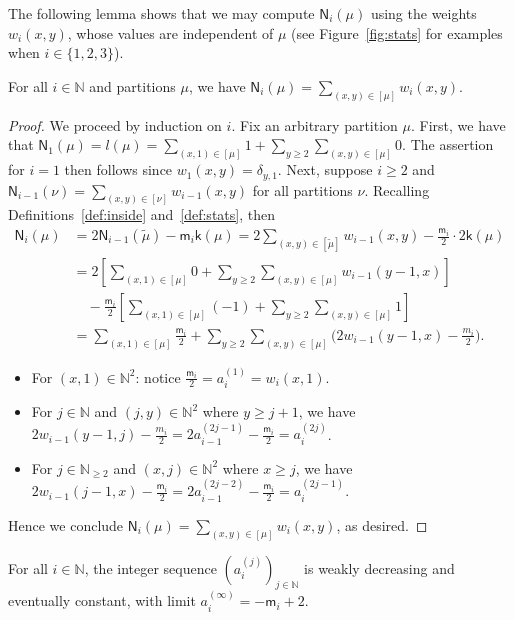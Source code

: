 \documentclass[ALCO, Unicode]{cedram}
\newcommand{\sk}{\mathsf{k}}
\newcommand{\sm}{\mathsf{m}}
\newcommand{\sn}{\mathsf{N}}
\newcommand{\N}{\mathbb{N}}
\begin{document}
The following lemma shows that we may compute $\sn_i(\mu)$ using the weights $w_i(x,y)$, whose values are independent of $\mu$ (see Figure~\ref{fig:stats} for examples when $i\in\{1,2,3\}$).
\begin{lemma}\label{lem:weights}
	For all $i\in\N$ and partitions $\mu$, we have $\sn_i(\mu) = \sum_{(x,y)\in[\mu]} w_i(x,y)$.
\end{lemma}

\begin{proof}
	We proceed by induction on $i$. Fix an arbitrary partition $\mu$.
	First, we have that $\sn_1(\mu)=l(\mu) = \sum_{(x,1)\in[\mu]}1 + \sum_{y\ge 2}\sum_{(x,y)\in[\mu]}0$. The assertion for $i=1$ then follows since $w_1(x,y)=\delta_{y,1}$.
	Next, suppose $i\ge 2$ and $\sn_{i-1}(\nu) = \sum_{(x,y)\in[\nu]} w_{i-1}(x,y)$ for all partitions $\nu$. Recalling Definitions~\ref{def:inside} and~\ref{def:stats}, then
	\begin{align*}
		\sn_i(\mu) &= 2\sn_{i-1}(\tilde{\mu}) - \sm_i\sk(\mu) = 2\sum_{(x,y)\in[\tilde{\mu}]} w_{i-1}(x,y) - \tfrac{\sm_i}{2}\cdot 2\sk(\mu)\\
		&=2\left[ \sum_{(x,1)\in[\mu]}0 + \sum_{y\ge 2}\sum_{(x,y)\in[\mu]}w_{i-1}(y-1,x)\right] \\&\quad- \tfrac{\sm_i}{2}\left[ \sum_{(x,1)\in[\mu]}(-1) + \sum_{y\ge 2}\sum_{(x,y)\in[\mu]}1 \right]\\
		&= \sum_{(x,1)\in[\mu]}\tfrac{\sm_i}{2} + \sum_{y\ge 2}\sum_{(x,y)\in[\mu]} \Big(2w_{i-1}(y-1,x)-\tfrac{m_i}{2}\Big).
	\end{align*}
	\begin{itemize}
		\item For $(x,1)\in\N^2$: notice $\tfrac{\sm_i}{2}=a_i^{(1)}=w_i(x,1)$.
		\item For $j\in\N$ and $(j,y)\in\N^2$ where $y\ge j+1$, we have $2w_{i-1}(y-1,j)-\tfrac{m_i}{2}=2a_{i-1}^{(2j-1)}-\tfrac{\sm_i}{2}=a_i^{(2j)}$. 
		\item For $j\in\N_{\ge 2}$ and $(x,j)\in\N^2$ where $x\ge j$, we have $2w_{i-1}(j-1,x)-\tfrac{\sm_i}{2}=2a_{i-1}^{(2j-2)}-\tfrac{\sm_i}{2}=a_i^{(2j-1)}$.
	\end{itemize}
	Hence we conclude $\sn_i(\mu) = \sum_{(x,y)\in[\mu]} w_i(x,y)$, as desired.
\end{proof}

\begin{lemma}\label{lem:19.3}
	For all $i\in\N$, the integer sequence $(a_i^{(j)})_{j\in\N}$ is weakly decreasing and eventually constant, with limit $a_i^{(\infty)} = -\sm_i+2$.
\end{lemma}
\end{document}
